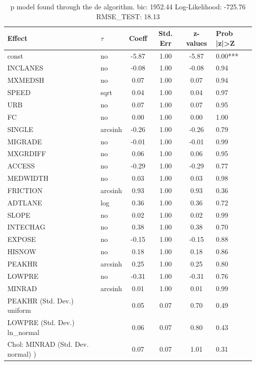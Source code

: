 \begin{table}
	\caption{p model found through the de algorithm. bic: 1952.44 Log-Likelihood: -725.76 RMSE_TEST: 18.13}
	\begin{center}
		\begin{tabular}{|l|l|c|c|c|l|}
			\hline
			Effect & $\tau$ & Coeff & Std. Err & z-values & Prob |z|>Z \\
			\hline
			const & no & -5.87 & 1.00 & -5.87 & 0.00*** \\
			\hline
			INCLANES & no & -0.08 & 1.00 & -0.08 & 0.94 \\
			\hline
			MXMEDSH & no & 0.07 & 1.00 & 0.07 & 0.94 \\
			\hline
			SPEED & sqrt & 0.04 & 1.00 & 0.04 & 0.97 \\
			\hline
			URB & no & 0.07 & 1.00 & 0.07 & 0.95 \\
			\hline
			FC & no & 0.00 & 1.00 & 0.00 & 1.00 \\
			\hline
			SINGLE & arcsinh & -0.26 & 1.00 & -0.26 & 0.79 \\
			\hline
			MIGRADE & no & -0.01 & 1.00 & -0.01 & 0.99 \\
			\hline
			MXGRDIFF & no & 0.06 & 1.00 & 0.06 & 0.95 \\
			\hline
			ACCESS & no & -0.29 & 1.00 & -0.29 & 0.77 \\
			\hline
			MEDWIDTH & no & 0.03 & 1.00 & 0.03 & 0.98 \\
			\hline
			FRICTION & arcsinh & 0.93 & 1.00 & 0.93 & 0.36 \\
			\hline
			ADTLANE & log & 0.36 & 1.00 & 0.36 & 0.72 \\
			\hline
			SLOPE & no & 0.02 & 1.00 & 0.02 & 0.99 \\
			\hline
			INTECHAG & no & 0.38 & 1.00 & 0.38 & 0.70 \\
			\hline
			EXPOSE & no & -0.15 & 1.00 & -0.15 & 0.88 \\
			\hline
			HISNOW & no & 0.18 & 1.00 & 0.18 & 0.86 \\
			\hline
			PEAKHR & arcsinh & 0.25 & 1.00 & 0.25 & 0.80 \\
			\hline
			LOWPRE & no & -0.31 & 1.00 & -0.31 & 0.76 \\
			\hline
			MINRAD & arcsinh & 0.01 & 1.00 & 0.01 & 0.99 \\
			\hline
			PEAKHR (Std. Dev.) uniform &  & 0.05 & 0.07 & 0.70 & 0.49 \\
			\hline
			LOWPRE (Std. Dev.) ln_normal &  & 0.06 & 0.07 & 0.80 & 0.43 \\
			\hline
			 Chol: MINRAD (Std. Dev. normal) ) &  & 0.07 & 0.07 & 1.01 & 0.31 \\
			\hline
		\end{tabular}
	\end{center}
\end{table}